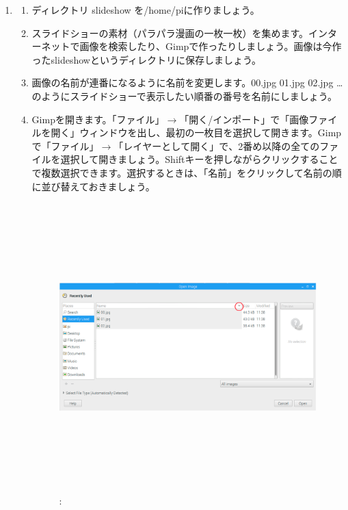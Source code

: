 \documentclass[a4paper,dvipdfmx]{jarticle}
\begin{document}
\begin{enumerate}
\item \begin{enumerate}
\item ディレクトリ slideshow
を/home/piに作りましょう。
\item
スライドショーの素材（パラパラ漫画の一枚一枚）を集めます。インターネットで画像を検索したり、Gimpで作ったりしましょう。画像は今作ったslideshowというディレクトリに保存しましょう。
\item
画像の名前が連番になるように名前を変更します。00.jpg
01.jpg 02.jpg {\dots}
のようにスライドショーで表示したい順番の番号を名前にしましょう。
\item Gimpを開きます。「ファイル」$\rightarrow
「開く$/インポート」で「画像ファイルを開く」ウィンドウを出し、最初の一枚目を選択して開きます。Gimpで「ファイル」$\rightarrow
「レイヤーとして開く」で、$2番め以降の全てのファイルを選択して開きましょう。Shiftキーを押しながらクリックすることで複数選択できます。選択するときは、「名前」をクリックして名前の順に並び替えておきましょう。
\begin{figure}
\centering
\caption[: ]{ \includegraphics[width=14.88cm,height=11.158cm]{text03-img/text03-img025.png} \newline
: }


\end{figure}
\end{enumerate}
\end{enumerate}
\end{document}
